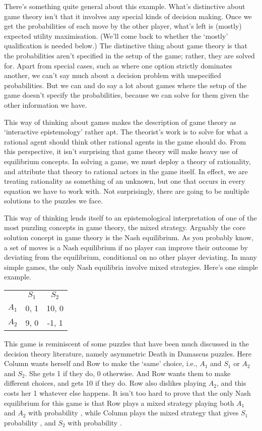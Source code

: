 There's something quite general about this example. What's distinctive about game theory isn't that it involves any special kinds of decision making. Once we get the probabilities of each move by the other player, what's left is (mostly) expected utility maximisation. (We'll come back to whether the `mostly' qualification is needed below.) The distinctive thing about game theory is that the probabilities aren't specified in the setup of the game; rather, they are solved for. Apart from special cases, such as where one option strictly dominates another, we can't say much about a decision problem with unspecified probabilities. But we can and do say a lot about games where the setup of the game doesn't specify the probabilities, because we can solve for them given the other information we have.

This way of thinking about games makes the description of game theory as `interactive epistemology' \citep{Aumann1999} rather apt. The theorist's work is to solve for what a rational agent should think other rational agents in the game should do. From this perspective, it isn't surprising that game theory will make heavy use of equilibrium concepts. In solving a game, we must deploy a theory of rationality, and attribute that theory to rational actors in the game itself. In effect, we are treating rationality as something of an unknown, but one that occurs in every equation we have to work with. Not surprisingly, there are going to be multiple solutions to the puzzles we face.

This way of thinking lends itself to an epistemological interpretation of one of the most puzzling concepts in game theory, the mixed strategy. Arguably the core solution concept in game theory is the Nash equilibrium. As you probably know, a set of moves is a Nash equilibrium if no player can improve their outcome by deviating from the equilibrium, conditional on no other player deviating. In many simple games, the only Nash equilibria involve mixed strategies. Here's one simple example.

\begin{center}
\begin{tabular}{r c c}
 & $S_1$ & $S_2$ \\
$A_1$ & 0, 1 & 10, 0 \\
$A_2$ & 9, 0 & -1, 1 
\end{tabular}
\end{center}

\noindent This game is reminiscent of some puzzles that have been much discussed in the decision theory literature, namely asymmetric Death in Damascus puzzles. Here Column wants herself and Row to make the `same' choice, i.e., $A_1$ and $S_1$ or $A_2$ and $S_2$. She gets 1 if they do, 0 otherwise. And Row wants them to make different choices, and gets 10 if they do. Row also dislikes playing $A_2$, and this costs her 1 whatever else happens. It isn't too hard to prove that the only Nash equilibrium for this game is that Row plays a mixed strategy playing both $A_1$ and $A_2$ with probability , while Column plays the mixed strategy that gives $S_1$ probability , and $S_2$ with probability .

